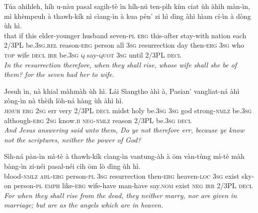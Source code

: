 \documentclass[11pt,a4paper]{article}
\begin{document}
\begin{exe}
\gll Túa ahihleh, híh u-nàu pasal sagih-tè ìn híh-nú ten-pìh kím ciat ùh àhìh màn-ìn, mì khèmpeuh à thawh-kík nì cìang-ìn à kua pèn' zi hì dìng àhì hìam cí-ìn à dòng ùh hì. \\
     that if this elder-younger husband seven-\textsc{pl} \textsc{erg} this-after stay-with nation each 2/3PL be.\textsc{3sg}.\textsc{rel} reason-\textsc{erg} person all \textsc{3sg} resurrection day then-\textsc{erg} \textsc{3sg} who \textsc{top} wife \textsc{decl} \textsc{irr} be.\textsc{3sg} \textsc{q} say-\textsc{quot} \textsc{3sg} until 2/3PL \textsc{decl} \\
\glt \textcolor{kjvcolor}{\textit{In the resurrection therefore, when they shall rise, whose wife shall she be of them? for the seven had her to wife.}}

\gll Jesuh ìn, nà khial màhmàh ùh hì. Lái Sìangtho àhì à, Pasian' vangliat-ná àhì zòng-ìn nà thèih lòh-ná hàng ùh àhì hì. \\
     \textsc{jesuh} \textsc{erg} \textsc{2sg} err very 2/3PL \textsc{decl} midst holy be.\textsc{3sg} \textsc{3sg} god strong-\textsc{nmlz} be.\textsc{3sg} although-\textsc{erg} \textsc{2sg} know.\textsc{ii} \textsc{neg}-\textsc{nmlz} reason 2/3PL be.\textsc{3sg} \textsc{decl} \\
\glt \textcolor{kjvcolor}{\textit{And Jesus answering said unto them, Do ye not therefore err, because ye know not the scriptures, neither the power of God?}}

\gll Sìh-ná pàn-ìn mì-tè à thawh-kík cìang-ìn vantung-àh à ōm vàn-tùng mì-tè màh bàng-ìn zi-néi pasal-néi cìh ōm lò dìng ùh hì. \\
     blood-\textsc{nmlz} \textsc{abl}-\textsc{erg} person-\textsc{pl} \textsc{3sg} resurrection then-\textsc{erg} heaven-\textsc{loc} \textsc{3sg} exist sky-on person-\textsc{pl} \textsc{emph} like-\textsc{erg} wife-have man-have say.\textsc{nom} exist \textsc{neg} \textsc{irr} 2/3PL \textsc{decl} \\
\glt \textcolor{kjvcolor}{\textit{For when they shall rise from the dead, they neither marry, nor are given in marriage; but are as the angels which are in heaven.}}


\end{exe}
\end{document}
